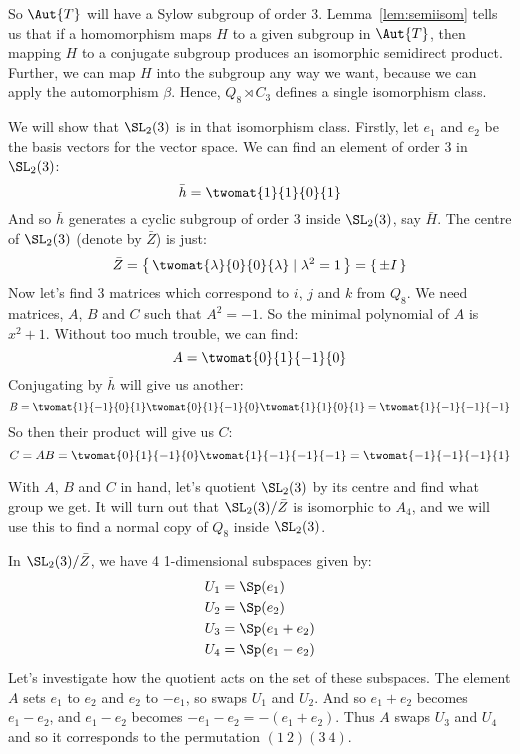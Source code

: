 \begin{enumerate}
        So \(\Aut{T}\) will have a Sylow subgroup of order 3.
        Lemma~\ref{lem:semiisom} tells us that if a homomorphism maps \(H\) to a given subgroup in \(\Aut{T}\), then
        mapping \(H\) to a conjugate subgroup produces an isomorphic semidirect product.
        Further, we can map \(H\) into the subgroup any way we want, because we can apply the automorphism \(\beta\).
        Hence, \(Q_8 \rtimes C_3\) defines a single isomorphism class.

        We will show that \(\SL_2(3)\) is in that isomorphism class.
        Firstly, let \(e_1\) and \(e_2\) be the basis vectors for the vector space.
        We can find an element of order 3 in \(\SL_2(3)\):
        \[\bar{h} = \twomat{1}{1}{0}{1}\]
        And so \(\bar{h}\) generates a cyclic subgroup of order 3 inside \(\SL_2(3)\), say \(\bar{H}\).
        The centre of \(\SL_2(3)\) (denote by \(\bar{Z}\)) is just:
        \[ \bar{Z} = \left\{\,\twomat{\lambda}{0}{0}{\lambda} \mid \lambda^2 = 1\,\right\} = \{\,\pm I\,\} \]
        Now let's find 3 matrices which correspond to \(i\), \(j\) and \(k\) from \(Q_8\).
        We need matrices, \(A\), \(B\) and \(C\) such that \(A^2 = -1\).
        So the minimal polynomial of \(A\) is \(x^2 + 1\).
        Without too much trouble, we can find:
        \[ A = \twomat{0}{1}{-1}{0} \]
        Conjugating by \(\bar{h}\) will give us another:
        \[ B = \twomat{1}{-1}{0}{1}\twomat{0}{1}{-1}{0}\twomat{1}{1}{0}{1} = \twomat{1}{-1}{-1}{-1} \]
        So then their product will give us \(C\):
        \[ C = AB = \twomat{0}{1}{-1}{0}\twomat{1}{-1}{-1}{-1} = \twomat{-1}{-1}{-1}{1} \]

        With \(A\), \(B\) and \(C\) in hand, let's quotient \(\SL_2(3)\) by its centre and find what group we get.
        It will turn out that \(\SL_2(3)/\bar{Z}\) is isomorphic to \(A_4\), and we will use this to find a normal copy of
        \(Q_8\) inside \(\SL_2(3)\).

        In \(\SL_2(3)/\bar{Z}\), we have 4 1-dimensional subspaces given by:
        \begin{align*}
            U_1 &= \Sp(e_1) \\
            U_2 &= \Sp(e_2) \\
            U_3 &= \Sp(e_1 + e_2) \\
            U_4 &= \Sp(e_1 - e_2)
        \end{align*}
        Let's investigate how the quotient acts on the set of these subspaces.
        The element \(A\) sets \(e_1\) to \(e_2\) and \(e_2\) to \(-e_1\), so swaps \(U_1\) and \(U_2\).
        And so \(e_1 + e_2\) becomes \(e_1 - e_2\), and \(e_1 - e_2\) becomes \(-e_1 - e_2 = -(e_1 + e_2)\).
        Thus \(A\) swaps \(U_{3}\) and \(U_4\) and so it corresponds to the permutation \((1\ 2)(3\ 4)\).


\end{enumerate}
